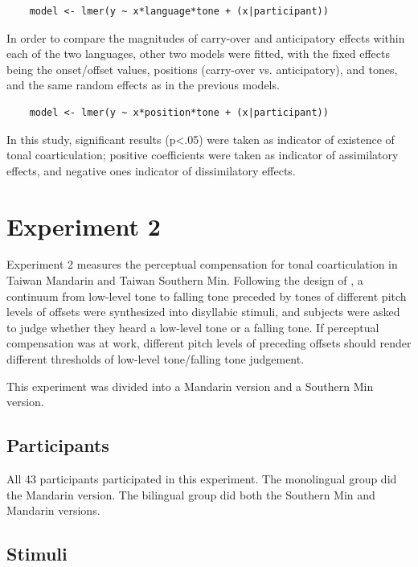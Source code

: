 \begin{lstlisting}
    model <- lmer(y ~ x*language*tone + (x|participant))
\end{lstlisting}

In order to compare the magnitudes of carry-over and anticipatory effects within each of the two languages, other two models were fitted, with the fixed effects being the onset/offset values, positions (carry-over vs. anticipatory), and tones, and the same random effects as in the previous models.

\begin{lstlisting}
    model <- lmer(y ~ x*position*tone + (x|participant))
\end{lstlisting}

In this study, significant results (p<.05) were taken as indicator of existence of tonal coarticulation; positive coefficients were taken as indicator of assimilatory effects, and negative ones indicator of dissimilatory effects.

\section{Experiment 2}\label{section:Experiment2}
Experiment 2 measures the perceptual compensation for tonal coarticulation in Taiwan Mandarin and Taiwan Southern Min. Following the design of \cite{Zhangetal2022}, a continuum from low-level tone to falling tone preceded by tones of different pitch levels of offsets were synthesized into disyllabic stimuli, and subjects were asked to judge whether they heard a low-level tone or a falling tone. If perceptual compensation was at work, different pitch levels of preceding offsets should render different thresholds of low-level tone/falling tone judgement.

This experiment was divided into a Mandarin version and a Southern Min version.

\subsection{Participants}
All 43 participants participated in this experiment. The monolingual group did the Mandarin version. The bilingual group did both the Southern Min and Mandarin versions.

\subsection{Stimuli}
